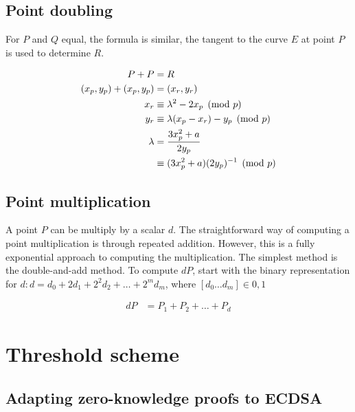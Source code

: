 \subsection{Point doubling}
For $P$ and $Q$ equal, the formula is similar, the tangent to the curve $E$ at
point $P$ is used to determine $R$.

\begin{equation*}
\begin{split}
  P + P &= R \\
  (x_p, y_p) + (x_p, y_p) &= (x_r, y_r) \\
  x_r &\equiv \lambda^2 - 2x_p \pmod p \\
  y_r &\equiv \lambda(x_p - x_r) - y_p \pmod p  \\
  \lambda &= \cfrac{3x_p^2 + a}{2y_p} \\
          &\equiv (3x_p^2 + a)(2y_p)^{-1} \pmod p
\end{split}
\end{equation*}

\subsection{Point multiplication}
A point $P$ can be multiply by a scalar $d$. The straightforward way of computing
a point multiplication is through repeated addition. However, this is a fully
exponential approach to computing the multiplication.
The simplest method is the double-and-add method. To compute $dP$, start with the
binary representation for $d : d = d_0 + 2d_1 + 2^2d_2 + \dots + 2^md_m$,
where $[ d_0 \dots d_m] \in {0,1}$

\begin{equation*}
\begin{split}
  dP &= P_1 + P_2 + \dots + P_d
\end{split}
\end{equation*}


\section{Threshold scheme}

\lipsum[1-2]

\subsection{Adapting zero-knowledge proofs to ECDSA}

